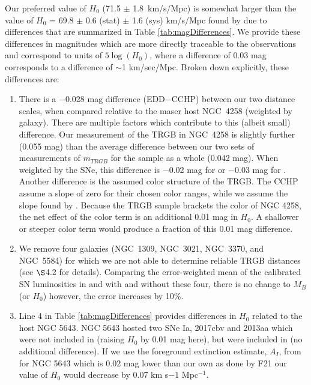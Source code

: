 \documentclass[twocolumn]{aastex62}
\newcommand{\hubblePan}{71.5 $\pm$ 1.8~km/s/Mpc}
\begin{document}
Our preferred value of $H_{0}$ (\hubblePan) is somewhat larger than the value of $H_{0}$ = 69.8 $\pm$ 0.6 (stat) $\pm$ 1.6 (sys) km/s/Mpc found by \cite{2021arXiv210615656F} due to differences that are summarized in Table \ref{tab:magDifferences}. We provide these differences in magnitudes which are more directly traceable to the observations and correspond to units of $5\log (H_0)$, where a difference of 0.03 mag corresponds to a difference of $\sim$1 km/sec/Mpc. Broken down explicitly, these differences are:

\begin{enumerate}
    \item There is a $-$0.028 mag difference (EDD$-$CCHP) between our two distance scales, when compared relative to the maser host NGC~4258 (weighted by galaxy). There are multiple factors which contribute to this (albeit small) difference. Our measurement of the TRGB in NGC~4258 is slightly further (0.055 mag) than the average difference between our two sets of measurements of $m_{TRGB}$ for the sample as a whole (0.042 mag). When weighted by the SNe, this difference is $-$0.02 mag for \cite{2021arXiv210615656F} or $-$0.03 mag for \cite{2019ApJ...882...34F}. Another difference is the assumed color structure of the TRGB.  The CCHP assume a slope of zero for their chosen color ranges, while we assume the slope found by \cite{2007ApJ...661..815R}. Because the TRGB sample brackets the color of NGC 4258, the net effect of the color term is an additional 0.01 mag in $H_0$. A shallower or steeper color term would produce a fraction of this 0.01 mag difference.
    
    \item We remove four galaxies (NGC~1309, NGC~3021, NGC~3370, and NGC~5584) for which we are not able to determine reliable TRGB distances (see $\S$4.2 for details). Comparing the error-weighted mean of the calibrated SN luminosities in \cite{2019ApJ...882...34F} and \cite{2021arXiv210615656F} with and without these four, there is no change to $M_B$ (or $H_0$) however, the error increases by 10\%.
    
    \item Line 4 in Table \ref{tab:magDifferences} provides differences in $H_0$ related to the host NGC 5643.  NGC 5643 hosted two SNe Ia, 2017cbv and 2013aa which were not included in \cite{2019ApJ...882...34F} (raising $H_0$ by 0.01 mag here), but were included in \cite{2021arXiv210615656F} (no additional difference). If we use the foreground extinction estimate, $A_I$, from \cite{2011ApJ...737..103S} for NGC 5643 which is 0.02 mag lower than our own as done by F21 our value of $H_0$ would decrease by 0.07 km s${-1}$ Mpc$^{-1}$.
    

\end{enumerate}
\end{document}
